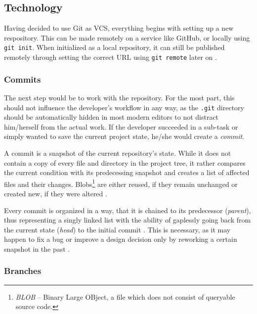 
\subsection{Technology}
\label{sec:git-technology}
Having decided to use Git as VCS, everything begins with setting up a new respository. This can be made remotely on a service like GitHub, or locally using \texttt{git init}. When initialized as a local repository, it can still be published remotely through setting the correct URL using \texttt{git remote} later on \cite[198]{loeliger2012version}.

\subsubsection{Commits}
The next step would be to work with the repository. For the most part, this should not influence the developer's workflow in any way, as the \texttt{.git} directory should be automatically hidden in most modern editors to not distract him/herself from the actual work. If the developer succeeded in a sub-task or simply wanted to save the current project state, he/she would create a \emph{commit}.

A commit is a snapshot of the current repository's state. While it does not contain a copy of every file and directory in the project tree, it rather compares the current condition with its predecessing snapshot and creates a list of affected files and their changes. Blobs\footnote{\emph{BLOB} -- Binary Large OBject, a file which does not consist of queryable source code.} are either reused, if they remain unchanged or created new, if they were altered \cite[65]{loeliger2012version}.

Every commit is organized in a way, that it is chained to its predecessor (\emph{parent}), thus representing a singly linked list with the ability of gaplessly going back from the current state (\emph{head}) to the initial commit \cite[204]{dhillon2016}\cite[65]{loeliger2012version}. This is necessary, as it may happen to fix a bug or improve a design decision only by reworking a certain snapshot in the past \cite[151]{loeliger2012version}.

\subsubsection{Branches}

